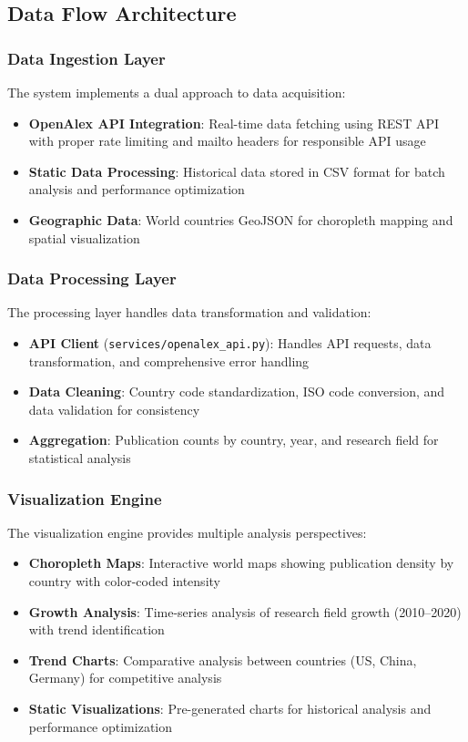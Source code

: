 \subsection{Data Flow Architecture}

\subsubsection{Data Ingestion Layer}

The system implements a dual approach to data acquisition:

\begin{itemize}
\item \textbf{OpenAlex API Integration}: Real-time data fetching using REST API with proper rate limiting and mailto headers for responsible API usage
\item \textbf{Static Data Processing}: Historical data stored in CSV format for batch analysis and performance optimization
\item \textbf{Geographic Data}: World countries GeoJSON for choropleth mapping and spatial visualization
\end{itemize}

\subsubsection{Data Processing Layer}

The processing layer handles data transformation and validation:

\begin{itemize}
\item \textbf{API Client} (\texttt{services/openalex\_api.py}): Handles API requests, data transformation, and comprehensive error handling
\item \textbf{Data Cleaning}: Country code standardization, ISO code conversion, and data validation for consistency
\item \textbf{Aggregation}: Publication counts by country, year, and research field for statistical analysis
\end{itemize}

\subsubsection{Visualization Engine}

The visualization engine provides multiple analysis perspectives:

\begin{itemize}
\item \textbf{Choropleth Maps}: Interactive world maps showing publication density by country with color-coded intensity
\item \textbf{Growth Analysis}: Time-series analysis of research field growth (2010--2020) with trend identification
\item \textbf{Trend Charts}: Comparative analysis between countries (US, China, Germany) for competitive analysis
\item \textbf{Static Visualizations}: Pre-generated charts for historical analysis and performance optimization
\end{itemize}

